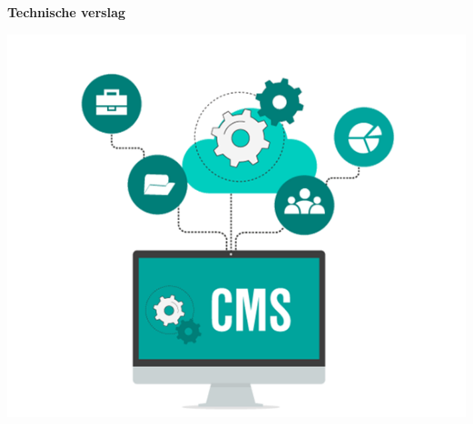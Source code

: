 \begin{titlepage}
   \begin{center}
       \vspace*{1cm}

		\Huge
		\textbf{Technische verslag}

		\vspace{0.5cm}
		
		\LARGE
		\ProjectName
            
		\vspace{1.5cm}

		\textbf{\StudentName}

		\vspace{3.0cm}
		
		\includegraphics[width=1\textwidth]{img/cmsheader.png}
   \end{center}
\end{titlepage}
